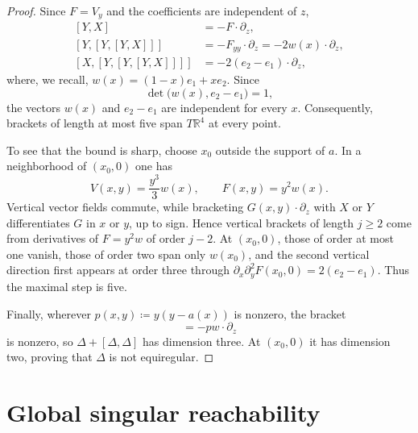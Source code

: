 \documentclass[11pt]{amsart}
\numberwithin{equation}{section}
\theoremstyle{remark}
\newcommand{\R}{\mathbb R}
\begin{document}
\begin{proof}
Since $F=V_y$ and the coefficients are
independent of $z$,
\begin{equation}
 \begin{aligned}
  {}[Y,X]&=-F\cdot\partial_z,\\
  [Y,[Y,[Y,X]]]&=-F_{yy}\cdot\partial_z
  =-2w(x)\cdot\partial_z,\\
  [X,[Y,[Y,[Y,X]]]]&=-2(e_2-e_1)\cdot\partial_z,
 \end{aligned}
\end{equation}
where, we recall, $w(x)= (1-x)e_1+xe_2$. Since
\begin{equation}
 \det\bigl(w(x),e_2-e_1\bigr)=1,
\end{equation}
the vectors $w(x)$ and $e_2-e_1$ are independent for every $x$.
Consequently, brackets of length at most five
span $T\R^4$ at every point.

To see that the bound is sharp, choose $x_0$ outside the support of $a$.
In a neighborhood of $(x_0,0)$ one has
\begin{equation}
 V(x,y)=\frac{y^3}{3}w(x),
 \qquad
 F(x,y)=y^2w(x).
\end{equation}
Vertical vector fields commute, while bracketing
$G(x,y)\cdot\partial_z$ with $X$ or $Y$ differentiates $G$ in $x$ or
$y$, up to sign.  Hence vertical brackets of length $j\geq2$ come from
derivatives of $F=y^2w$ of order $j-2$.  At $(x_0,0)$, those of order at
most one vanish, those of order two span only $w(x_0)$, and the second
vertical direction first appears at order three through
$\partial_x\partial_y^2F(x_0,0)=2(e_2-e_1)$.  Thus the maximal step is five.

Finally, wherever $p(x,y)\coloneq y(y-a(x))$ is nonzero, the bracket
\begin{equation}
 [Y,X]=-p w\cdot\partial_z
\end{equation}
is nonzero, so $\Delta+[\Delta,\Delta]$ has dimension three.  At
$(x_0,0)$ it has dimension two, proving that $\Delta$ is not equiregular.
\end{proof}

\section{Global singular reachability}
\end{document}
